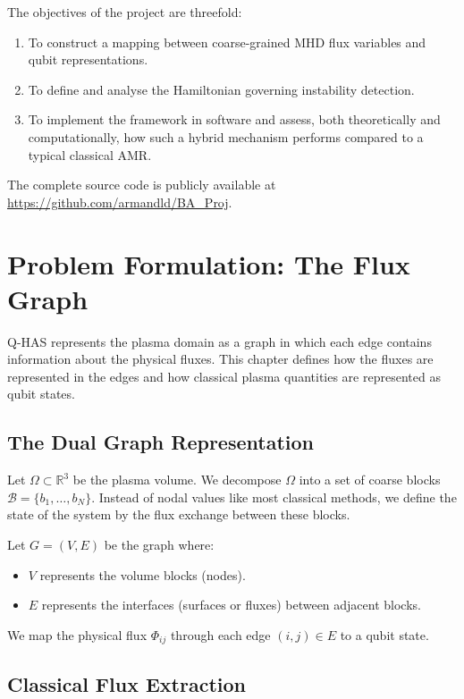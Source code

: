 \documentclass[12pt, a4paper, oneside]{report}
\begin{document}
The objectives of the project are threefold:
\begin{enumerate}
    \item To construct a mapping between coarse-grained MHD flux variables and qubit representations.
    \item To define and analyse the Hamiltonian governing instability detection.
    \item To implement the framework in software and assess, both theoretically and computationally, how such a hybrid mechanism performs compared to a typical classical AMR.
\end{enumerate}

The complete source code is publicly available at \url{https://github.com/armandld/BA_Proj}.

\chapter{Problem Formulation: The Flux Graph}
\label{chap:flux-graph}

Q-HAS represents the plasma domain as a graph in which each edge contains information about the physical fluxes. This chapter defines how the fluxes are represented in the edges and how classical plasma quantities are represented as qubit states.

\section{The Dual Graph Representation}

Let $\Omega \subset \mathbb{R}^3$ be the plasma volume. We decompose $\Omega$ into a set of coarse blocks $\mathcal{B} = \{b_1, \dots, b_N\}$.
Instead of nodal values like most classical methods, we define the state of the system by the flux exchange between these blocks.

Let $G = (V, E)$ be the graph where:
\begin{itemize}
    \item $V$ represents the volume blocks (nodes).
    \item $E$ represents the interfaces (surfaces or fluxes) between adjacent blocks.
\end{itemize}

We map the physical flux $\Phi_{ij}$ through each edge $(i,j) \in E$ to a qubit state.

\section{Classical Flux Extraction}
\end{document}
